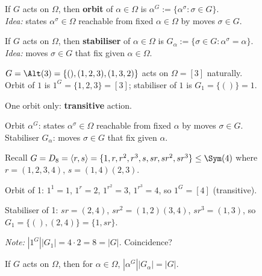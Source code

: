 \begin{slide}
    \begin{definition}[orbit]
        \vspace{0pt}
        If $G$ acts on $\Omega$, then \textbf{orbit} of $\alpha \in \Omega$ is $\alpha^G := \{\alpha^\sigma : \sigma \in G\}$. \\
        \textit{Idea:} states $\alpha^\sigma \in \Omega$ reachable from fixed $\alpha \in \Omega$ by moves $\sigma \in G$. \pause
    \end{definition}

    \begin{definition}[stabiliser]
        \vspace{0pt}
        If $G$ acts on $\Omega$, then \textbf{stabiliser} of $\alpha \in \Omega$ is $G_\alpha := \{\sigma \in G : \alpha^\sigma = \alpha\}$. \\
        \textit{Idea:} moves $\sigma \in G$ that fix given $\alpha \in \Omega$. \pause
    \end{definition}

    \begin{example}
        \vspace{0pt}
        $G = \Alt(3) = \{(),(1,2,3),(1,3,2)\}$ acts on $\Omega = [3]$ naturally. \\
        Orbit of $1$ is \pause $1^G = \{1,2,3\} = [3]$; stabiliser of $1$ is \pause $G_1 = \{()\} = 1$.

        One orbit only: \textbf{transitive} action.
    \end{example}
\end{slide}

\begin{slide}
    Orbit $\alpha^G$: states $\alpha^\sigma \in \Omega$ reachable from fixed $\alpha$ by moves $\sigma \in G$. \\
    Stabiliser $G_\alpha$: moves $\sigma \in G$ that fix given $\alpha$.

    \begin{example}
        \vspace{0pt}
        Recall $G = D_8 = \langle r,s \rangle = \{1,r,r^2,r^3,s,sr,sr^2,sr^3\} \leq \Sym(4)$ where $r = (1,2,3,4)$, $s = (1,4)(2,3)$.

        Orbit of 1: $1^1 = 1$, $1^r = 2$, $1^{r^2} = 3$, $1^{r^3} = 4$, so $1^G = [4]$ (transitive).

        Stabiliser of 1: $sr = (2,4)$, $sr^2 = (1,2)(3,4)$, $sr^3 = (1,3)$, so $G_1 = \{(),(2,4)\} = \{1,sr\}$.

        \textit{Note:} $|1^G||G_1| = 4 \cdot 2 = 8 = |G|$. Coincidence?
    \end{example}

    \begin{theorem}
        \vspace{0pt}
        If $G$ acts on $\Omega$, then for $\alpha \in \Omega$, $|\alpha^G||G_\alpha| = |G|$.
    \end{theorem}
\end{slide}
